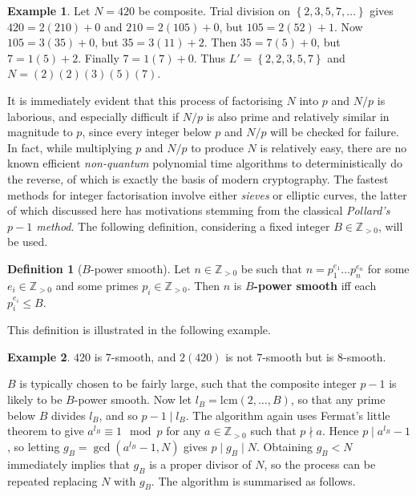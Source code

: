 \documentclass{article}
\newcommand{\Z}{\mathbb{Z}}
\newcommand{\rb}[1]{\left( #1 \right)}
\newcommand{\cb}[1]{\left\{ #1 \right\}}
\theoremstyle{definition}\newtheorem*{definition}{Definition}
\theoremstyle{definition}\newtheorem*{example}{Example}
\theoremstyle{definition}\newtheorem*{remark}{Remark}
\begin{document}
\begin{example}
Let $ N = 420 $ be composite. Trial division on $ \cb{2, 3, 5, 7, \dots} $ gives $ 420 = 2\rb{210} + 0 $ and $ 210 = 2\rb{105} + 0 $, but $ 105 = 2\rb{52} + 1 $. Now $ 105 = 3\rb{35} + 0 $, but $ 35 = 3\rb{11} + 2 $. Then $ 35 = 7\rb{5} + 0 $, but $ 7 = 1\rb{5} + 2 $. Finally $ 7 = 1\rb{7} + 0 $. Thus $ L' = \cb{2, 2, 3, 5, 7} $ and $ N = \rb{2}\rb{2}\rb{3}\rb{5}\rb{7} $.
\end{example}

It is immediately evident that this process of factorising $ N $ into $ p $ and $ N / p $ is laborious, and especially difficult if $ N / p $ is also prime and relatively similar in magnitude to $ p $, since every integer below $ p $ and $ N / p $ will be checked for failure. In fact, while multiplying $ p $ and $ N / p $ to produce $ N $ is relatively easy, there are no known efficient \emph{non-quantum} polynomial time algorithms to deterministically do the reverse, of which is exactly the basis of modern cryptography. The fastest methods for integer factorisation involve either \emph{sieves} or elliptic curves, the latter of which discussed here has motivations stemming from the classical \emph{Pollard's $ p - 1 $ method}. The following definition, considering a fixed integer $ B \in \Z_{> 0} $, will be used.

\begin{definition}[$ B $-power smooth]
Let $ n \in \Z_{> 0} $ be such that $ n = p_1^{e_1} \dots p_n^{e_n} $ for some $ e_i \in \Z_{> 0} $ and some primes $ p_i \in \Z_{> 0} $. Then $ n $ is \textbf{$ B $-power smooth} iff each $ p_i^{e_i} \le B $.
\end{definition}

This definition is illustrated in the following example.

\begin{example}
$ 420 $ is $ 7 $-smooth, and $ 2\rb{420} $ is not $ 7 $-smooth but is $ 8 $-smooth.
\end{example}

$ B $ is typically chosen to be fairly large, such that the composite integer $ p - 1 $ is likely to be $ B $-power smooth. Now let $ l_B = \text{lcm}\rb{2, \dots, B} $, so that any prime below $ B $ divides $ l_B $, and so $ p - 1 \mid l_B $. The algorithm again uses Fermat's little theorem to give $ a^{l_B} \equiv 1 \mod p $ for any $ a \in \Z_{> 0} $ such that $ p \nmid a $. Hence $ p \mid a^{l_B} - 1 $, so letting $ g_B = \gcd\rb{a^{l_B} - 1, N} $ gives $ p \mid g_B \mid N $. Obtaining $ g_B < N $ immediately implies that $ g_B $ is a proper divisor of $ N $, so the process can be repeated replacing $ N $ with $ g_B $. The algorithm is summarised as follows.
\end{document}
